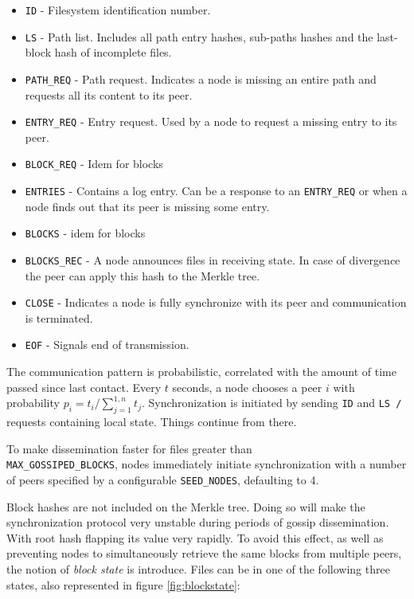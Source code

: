 \documentclass{sig-alternate}
\begin{document}
\begin{itemize}
\item \texttt{ID} - Filesystem identification number. 
\item \texttt{LS} - Path list. Includes all path entry hashes, sub-paths hashes and the last-block hash of incomplete files.
\item \texttt{PATH\_REQ} - Path request. Indicates a node is missing an entire path and requests all its content to its peer.
\item \texttt{ENTRY\_REQ} - Entry request. Used by a node to request a missing entry to its peer.
\item \texttt{BLOCK\_REQ} - Idem for blocks
\item \texttt{ENTRIES} - Contains a log entry. Can be a response to an \texttt{ENTRY\_REQ} or when a node finds out that its peer is missing some entry.
\item \texttt{BLOCKS} - idem for blocks
\item \texttt{BLOCKS\_REC} - A node announces files in receiving state. In case of divergence the peer can apply this hash to the Merkle tree.
\item \texttt{CLOSE} - Indicates a node is fully synchronize with its peer and communication is terminated.
\item \texttt{EOF} - Signals end of transmission.
\end{itemize}

The communication pattern is probabilistic, correlated with the amount of time passed since last contact. Every $t$ seconds, a node chooses a peer $i$ with probability $p_i = t_i/\sum_{j=1}^{1,n} t_j$. Synchronization is initiated by sending \texttt{ID} and \texttt{LS /} requests containing local state. Things continue from there.

To make dissemination faster for files greater than \\ \texttt{MAX\_GOSSIPED\_BLOCKS}, nodes immediately initiate synchronization with a number of peers specified by a configurable \texttt{SEED\_NODES}, defaulting to 4.

Block hashes are not included on the Merkle tree. Doing so will make the synchronization protocol very unstable during periods of gossip dissemination. With root hash flapping its value very rapidly. To avoid this effect, as well as preventing nodes to simultaneously retrieve the same blocks from multiple peers, the notion of \textit{block state} is introduce. Files can be in one of the following three states, also represented in figure \ref{fig:blockstate}:
\end{document}
